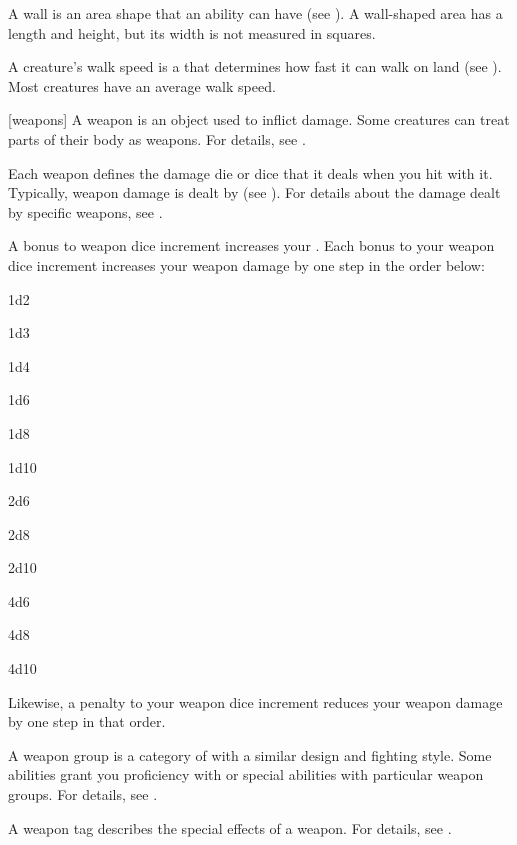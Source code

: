  A wall is an area shape that an ability can have (see ).
A wall-shaped area has a length and height, but its width is not measured in squares.

 A creature's walk speed is a  that determines how fast it can walk on land (see ).
Most creatures have an average walk speed.

[weapons] A weapon is an object used to inflict damage.
Some creatures can treat parts of their body as weapons.
For details, see .

 Each weapon defines the damage die or dice that it deals when you hit with it.
Typically, weapon damage is dealt by  (see ).
For details about the damage dealt by specific weapons, see .

 A bonus to weapon dice increment increases your .
Each  bonus to your weapon dice increment increases your weapon damage by one step in the order below:
\begin{raggeditemize}
  \item 1d2
  \item 1d3
  \item 1d4
  \item 1d6
  \item 1d8
  \item 1d10
  \item 2d6
  \item 2d8
  \item 2d10
  \item 4d6
  \item 4d8
  \item 4d10
\end{raggeditemize}

Likewise, a  penalty to your weapon dice increment reduces your weapon damage by one step in that order.

 A weapon group is a category of  with a similar design and fighting style.
Some abilities grant you proficiency with or special abilities with particular weapon groups.
For details, see .

 A weapon tag describes the special effects of a weapon.
For details, see .


